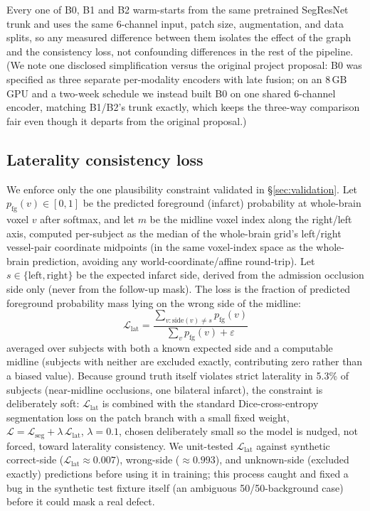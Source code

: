 \documentclass[conference]{IEEEtran}
\begin{document}
Every one of B0, B1 and B2 warm-starts from the same pretrained SegResNet trunk and uses the same 6-channel input, patch size, augmentation, and data splits, so any measured difference between them isolates the effect of the graph and the consistency loss, not confounding differences in the rest of the pipeline. (We note one disclosed simplification versus the original project proposal: B0 was specified as three separate per-modality encoders with late fusion; on an 8\,GB GPU and a two-week schedule we instead built B0 on one shared 6-channel encoder, matching B1/B2's trunk exactly, which keeps the three-way comparison fair even though it departs from the original proposal.)

\subsection{Laterality consistency loss}
\label{sec:loss}

We enforce only the one plausibility constraint validated in \S\ref{sec:validation}. Let $p_{\text{fg}}(v) \in [0,1]$ be the predicted foreground (infarct) probability at whole-brain voxel $v$ after softmax, and let $m$ be the midline voxel index along the right/left axis, computed per-subject as the median of the whole-brain grid's left/right vessel-pair coordinate midpoints (in the same voxel-index space as the whole-brain prediction, avoiding any world-coordinate/affine round-trip). Let $s \in \{\text{left}, \text{right}\}$ be the expected infarct side, derived from the admission occlusion side only (never from the follow-up mask). The loss is the fraction of predicted foreground probability mass lying on the wrong side of the midline:
\begin{equation}
\label{eq:consistloss}
\mathcal{L}_{\text{lat}} = \frac{\sum_{v : \mathrm{side}(v) \neq s} p_{\text{fg}}(v)}{\sum_{v} p_{\text{fg}}(v) + \varepsilon}
\end{equation}
averaged over subjects with both a known expected side and a computable midline (subjects with neither are excluded exactly, contributing zero rather than a biased value). Because ground truth itself violates strict laterality in 5.3\% of subjects (near-midline occlusions, one bilateral infarct), the constraint is deliberately soft: $\mathcal{L}_{\text{lat}}$ is combined with the standard Dice-cross-entropy segmentation loss on the patch branch with a small fixed weight, $\mathcal{L} = \mathcal{L}_{\text{seg}} + \lambda\,\mathcal{L}_{\text{lat}}$, $\lambda = 0.1$, chosen deliberately small so the model is nudged, not forced, toward laterality consistency. We unit-tested $\mathcal{L}_{\text{lat}}$ against synthetic correct-side ($\mathcal{L}_{\text{lat}} \approx 0.007$), wrong-side ($\approx 0.993$), and unknown-side (excluded exactly) predictions before using it in training; this process caught and fixed a bug in the synthetic test fixture itself (an ambiguous 50/50-background case) before it could mask a real defect.
\end{document}
